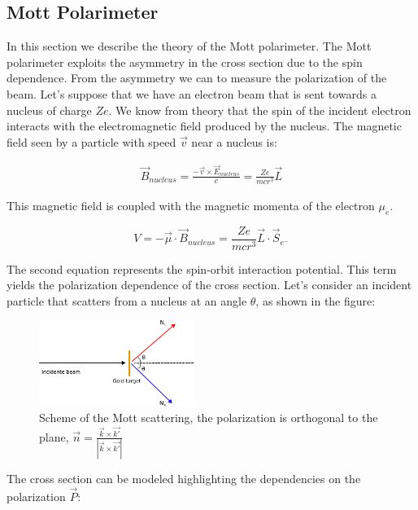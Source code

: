 \subsection{Mott Polarimeter}

In this section we describe the theory of the Mott polarimeter. The Mott polarimeter exploits the asymmetry in the cross section due to the spin dependence. From the asymmetry we can to measure the polarization of the beam. 
Let's suppose that we have an electron beam that is sent towards a nucleus of charge $Ze$. We know from theory \cite{MottElectron} that the spin of the incident electron interacts with the electromagnetic field produced by the nucleus.
The magnetic field seen by a particle with speed $\vec{v}$ near a nucleus is:

\begin{align*}
\vec{B}_{nucleus} = \frac{-\vec{v} \times \vec{E}_{nucleus}}{c}  = \frac{Ze}{mc r^{3}} \vec{L} 
\end{align*}

This magnetic field is coupled with the magnetic momenta of the electron $\mu_{e}$.

\begin{equation}
V = - \vec{\mu} \cdot \vec{B}_{nucleus} = \frac{Ze}{mcr^{3}} \vec{L} \cdot \vec{S}_{e^{-}}
\end{equation}

The second equation represents the spin-orbit interaction potential. This term yields the polarization dependence of the cross section. Let's consider an incident particle that scatters from a nucleus at an angle $\theta$, as shown in the figure:

\begin{figure}[hbtp]
\centering
\includegraphics[width = 0.45\textwidth]{ExperimentalSetup/MottScattering.pdf}
\caption{Scheme of the Mott scattering, the polarization is orthogonal to the plane,  $ \vec{n} = \frac{\vec{k} \times \vec{k'}}{|\vec{k} \times \vec{k'}|}$}
\label{fig:MottScatt}
\end{figure}

The cross section can be modeled highlighting the dependencies on the polarization $\vec{P}$:

